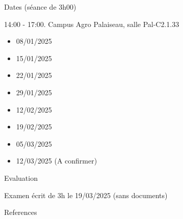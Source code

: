 \documentclass[compress,10pt]{beamer}
\begin{document}
 
\begin{frame}{
Dates (séance de 3h00)} 

14:00 - 17:00. Campus Agro Palaiseau,   salle Pal-C2.1.33


\begin{itemize}
\item 08/01/2025
\item 15/01/2025 
\item 22/01/2025 
 \item 29/01/2025 
\item 12/02/2025
\item 19/02/2025
 \item 05/03/2025
 \item 12/03/2025 (A confirmer)
\end{itemize}

 
 
 
 
\end{frame}


\begin{frame}{Evaluation}
 
 
 Examen écrit de 3h le 19/03/2025 (sans documents)
 
 
\end{frame}





\begin{frame}{References}

 
\end{frame}
  
\end{document}
